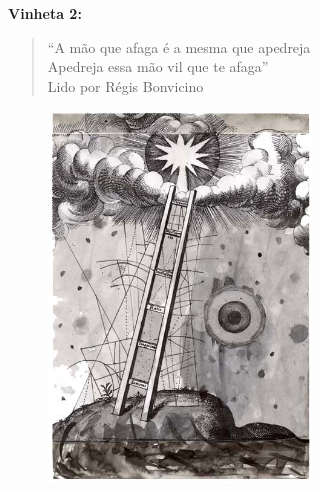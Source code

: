 \begin{absolutelynopagebreak}
\textbf{Vinheta 2:}


\begin{verse}
``A mão que afaga é a mesma que apedreja\\
Apedreja essa mão vil que te afaga''\\[5pt]
Lido por Régis Bonvicino
\end{verse}


\begin{vplace}
\begin{figure}[H]
  \centering
  \vspace*{5cm}
  \includegraphics[width=70mm]{./imgs/caparc2.jpg}  

\end{figure}
\end{vplace}

\end{absolutelynopagebreak}

\pagebreak


